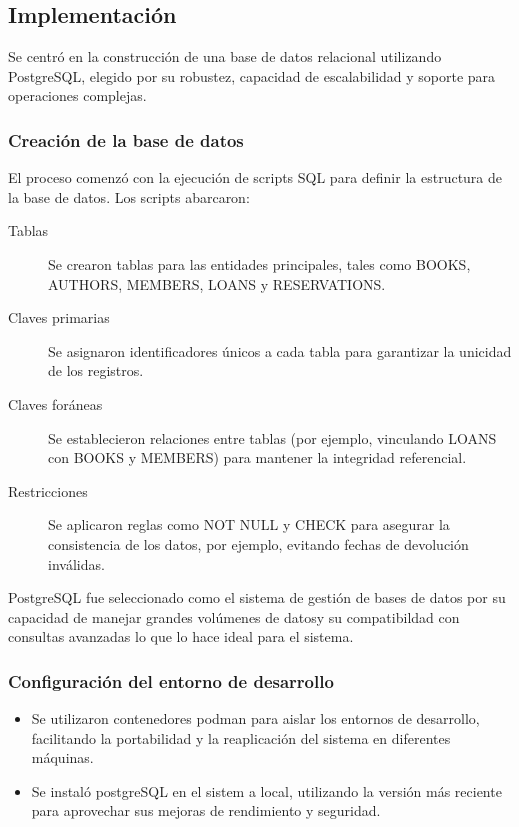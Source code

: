 \documentclass[12pt, a4paper]{article}
\begin{document}
\subsection{Implementación}
Se centró en la construcción de una base de datos relacional utilizando PostgreSQL, elegido por su robustez, capacidad de escalabilidad y soporte para operaciones complejas.

\subsubsection{Creación de la base de datos}
El proceso comenzó con la ejecución de scripts SQL para definir la estructura de la base de datos. Los scripts abarcaron:

\begin{description}
 \item [Tablas] Se crearon tablas para las entidades principales, tales como BOOKS, AUTHORS, MEMBERS, LOANS y RESERVATIONS.
 \item [Claves primarias] Se asignaron identificadores únicos a cada tabla para garantizar la unicidad de los registros.
 \item [Claves foráneas] Se establecieron relaciones entre tablas (por ejemplo, vinculando LOANS con BOOKS y MEMBERS) para mantener la integridad referencial.
 \item [Restricciones] Se aplicaron reglas como NOT NULL y CHECK para asegurar la consistencia de los datos, por ejemplo, evitando fechas de devolución inválidas.
\end{description}

PostgreSQL fue seleccionado como el sistema de gestión de bases de datos por su capacidad de manejar grandes volúmenes de datosy su compatibildad con consultas avanzadas lo que lo hace ideal para el sistema.

\subsubsection{Configuración del entorno de desarrollo}
\begin{itemize}
 \item Se utilizaron contenedores podman para aislar los entornos de desarrollo, facilitando la portabilidad y la reaplicación del sistema en diferentes máquinas.
 \item Se instaló postgreSQL en el sistem a local, utilizando la versión más reciente para aprovechar sus mejoras de rendimiento y seguridad.
\end{itemize}
\end{document}
